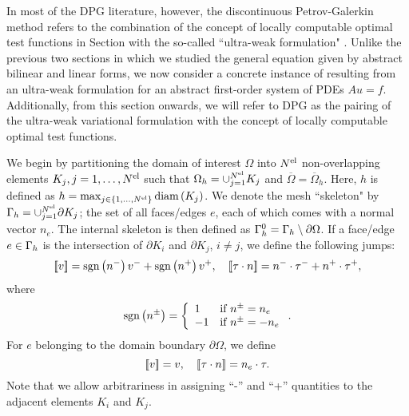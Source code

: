 In most of the DPG literature, however, the discontinuous Petrov-Galerkin method refers to the combination of the concept of locally computable optimal test functions in Section  with the so-called ``ultra-weak formulation" \cite{DPG1,DPG2,DPG3,DPG4,DPGElas,DBLP:journals/procedia/NiemiCC11}. Unlike the previous two sections in which we studied the general equation  given by abstract bilinear and linear forms, we now consider a concrete instance of  resulting from an ultra-weak formulation for an abstract first-order system of PDEs $Au = f$. Additionally, from this section onwards, we will refer to DPG as the pairing of the ultra-weak variational formulation with the concept of locally computable optimal test functions. 

We begin by partitioning the domain of interest $\Omega$ into $\Nel$ non-overlapping elements $K_j, j = 1,\hdots,\Nel$ such that $\Oh = \cup_{j=1}^\Nel K_j$ and $\overline{\Omega} = \overline{\Omega}_h$. Here, $h$ is defined as $h= \max_{j\in \LRc{1,\hdots,\Nel}}\text{diam}\LRp{K_j}$.  We denote the mesh ``skeleton" by $\Gh = \cup_{j=1}^\Nel \partial K_j$; the set of all faces/edges $e$, each of which comes with a normal vector ${n}_e$. The internal skeleton is then defined as $\Gamma^0_h = \Gh \setminus \partial \Omega$. If a face/edge $e \in \Gh$ is the intersection of $\partial K_i$ and $\partial K_j$, $i \ne j$, we define the following jumps:
\[
\jump{v} = \text{sgn} \LRp{{n}^-}v^- + \text{sgn} \LRp{{n}^+}v^+, \quad
\jump{\tau \cdot n} = {n}^-\cdot \tau^- + {n}^+\cdot\tau^+,
\]
where
\[
\text{sgn}\LRp{{n}^{\pm}} =
\left\{
\begin{array}{ll}
1 & \text{if } {n}^{\pm} = {n}_e \\
-1 & \text{if } {n}^\pm = -{n}_e
\end{array}
\right..
\]
For $e$ belonging to the domain boundary $\partial \Omega$, we define
\[
\jump{v} = v, \quad
\jump{\tau \cdot n} = {n}_e\cdot \tau.
\]
Note that we allow arbitrariness in assigning ``-'' and ``+'' quantities to the adjacent elements $K_i$ and $K_j$.

